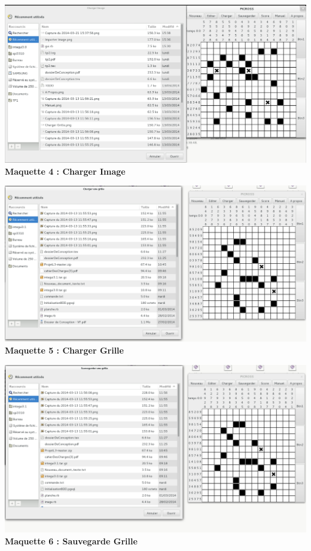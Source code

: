 \begin{center}
                \includegraphics[scale=0.6]{data/screenMaquette/ChargerImage.png}\\
                \textbf{Maquette 4 : Charger Image}
\end{center}

\begin{center}
                \includegraphics[scale=0.6]{data/screenMaquette/ChargerGrille.png}\\
                \textbf{Maquette 5 : Charger Grille}
\end{center}

\begin{center}
                \includegraphics[scale=0.6]{data/screenMaquette/SauvegardeGrille.png}\\
                \textbf{Maquette 6 : Sauvegarde Grille}
\end{center}



